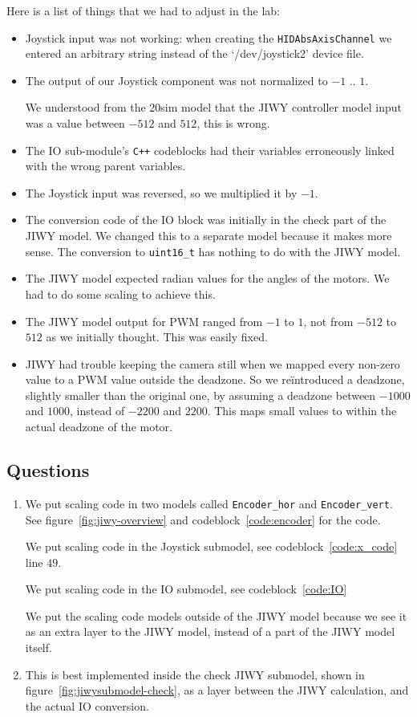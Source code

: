 \documentclass[a4paper,twoside,11pt]{article}
\newcommand{\cpp}{{\tt C++} }
\begin{document}
Here is a list of things that we had to adjust in the lab:
\begin{itemize}
	\item Joystick input was not working: when creating the \texttt{HIDAbsAxisChannel} we entered an arbitrary string instead of the `/dev/joystick2' device file.
	\item The output of our Joystick component was not normalized to $-1$ .. $1$.

		We understood from the 20sim model that the JIWY controller model input was a value between $-512$ and $512$, this is wrong.
	\item The IO sub-module's \cpp codeblocks had their variables erroneously linked with the wrong parent variables.
	\item The Joystick input was reversed, so we multiplied it by $-1$.
	\item The conversion code of the IO block was initially in the check part of the JIWY model.
		We changed this to a separate model because it makes more sense. The conversion to \texttt{uint16\_t} has nothing to do with the JIWY model.
	\item The JIWY model expected radian values for the angles of the motors. We had to do some scaling to achieve this.
	\item The JIWY model output for PWM ranged from $-1$ to $1$, not from $-512$ to $512$ as we initially thought. This was easily fixed.
	\item JIWY had trouble keeping the camera still when we mapped every non-zero value to a PWM value outside the deadzone. So we re\"introduced a deadzone, slightly smaller than the original one, by assuming a deadzone between $-1000$ and $1000$, instead of $-2200$ and $2200$. This maps small values to within the actual deadzone of the motor.
\end{itemize}

\subsection{Questions}
\begin{enumerate}
	\item We put scaling code in two models called \texttt{Encoder\_hor} and 
		\texttt{Encoder\_vert}. See figure~\ref{fig:jiwy-overview} and codeblock~\ref{code:encoder} for the code.
		
		We put scaling code in the Joystick submodel, see codeblock~\ref{code:x_code} line $49$.
		
		We put scaling code in the IO submodel, see codeblock~\ref{code:IO}

		We put the scaling code models outside of the JIWY model because we see it as an extra layer to the JIWY model, instead of a part of the JIWY model itself.
	\item This is best implemented inside the check JIWY submodel, shown in figure~\ref{fig:jiwysubmodel-check}, as a layer between the JIWY calculation, and the actual IO conversion.
\end{enumerate}
\end{document}
